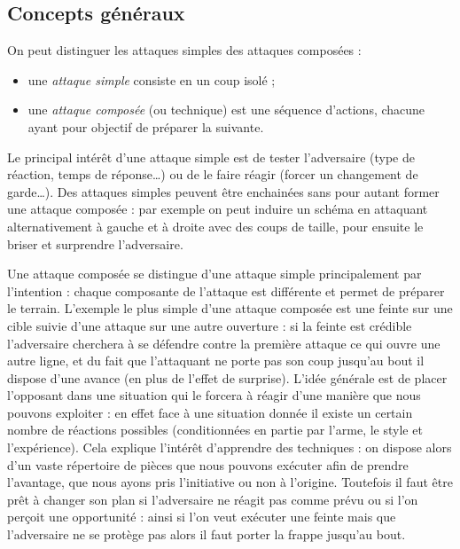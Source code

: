 \subsection{Concepts généraux}
\label{sec:att-def:attaque:concepts}


\begin{definition}

\noindent
On peut distinguer les attaques simples des attaques composées :
\begin{itemize}
	\item une \emph{attaque simple} consiste en un coup isolé ;
	\item une \emph{attaque composée} (ou technique) est une séquence d'actions, chacune ayant pour objectif de préparer la suivante.
\end{itemize}
\end{definition}


Le principal intérêt d'une attaque simple est de tester l'adversaire (type de réaction, temps de réponse…) ou de le faire réagir (forcer un changement de garde…).
Des attaques simples peuvent être enchainées sans pour autant former une attaque composée : par exemple on peut induire un schéma en attaquant alternativement à gauche et à droite avec des coups de taille, pour ensuite le briser et surprendre l'adversaire.

Une attaque composée se distingue d'une attaque simple principalement par l'intention : chaque composante de l'attaque est différente et permet de préparer le terrain.
L'exemple le plus simple d'une attaque composée est une feinte sur une cible suivie d'une attaque sur une autre ouverture : si la feinte est crédible l'adversaire cherchera à se défendre contre la première attaque ce qui ouvre une autre ligne, et du fait que l'attaquant ne porte pas son coup jusqu'au bout il dispose d'une avance (en plus de l'effet de surprise).
L'idée générale est de placer l'opposant dans une situation qui le forcera à réagir d'une manière que nous pouvons exploiter : en effet face à une situation donnée il existe un certain nombre de réactions possibles (conditionnées en partie par l'arme, le style et l'expérience).
Cela explique l'intérêt d'apprendre des techniques : on dispose alors d'un vaste répertoire de pièces que nous pouvons exécuter afin de prendre l'avantage, que nous ayons pris l'initiative ou non à l'origine.
Toutefois il faut être prêt à changer son plan si l'adversaire ne réagit pas comme prévu ou si l'on perçoit une opportunité : ainsi si l'on veut exécuter une feinte mais que l'adversaire ne se protège pas alors il faut porter la frappe jusqu'au bout.

